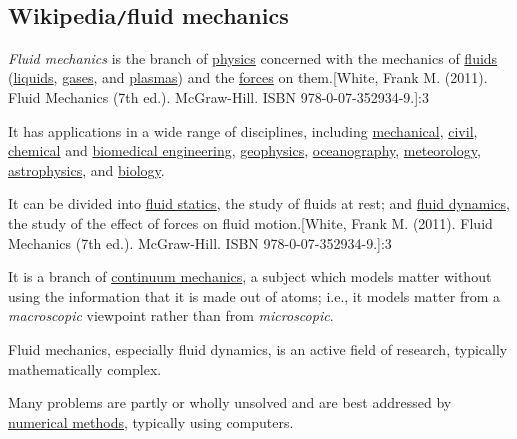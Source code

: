 \documentclass{article}
\begin{document}

\subsection{Wikipedia{\tt/}fluid mechanics}
\textit{Fluid mechanics} is the branch of \href{https://en.wikipedia.org/wiki/Physics}{physics} concerned with the mechanics of \href{https://en.wikipedia.org/wiki/Fluid}{fluids} (\href{https://en.wikipedia.org/wiki/Liquid}{liquids}, \href{https://en.wikipedia.org/wiki/Gas}{gases}, and \href{https://en.wikipedia.org/wiki/Plasma_(physics)}{plasmas}) and the \href{https://en.wikipedia.org/wiki/Force}{forces} on them.[White, Frank M. (2011). Fluid Mechanics (7th ed.). McGraw-Hill. ISBN 978-0-07-352934-9.]:3

It has applications in a wide range of disciplines, including \href{https://en.wikipedia.org/wiki/Mechanical_engineering}{mechanical}, \href{https://en.wikipedia.org/wiki/Civil_engineering}{civil}, \href{https://en.wikipedia.org/wiki/Chemical_engineering}{chemical} and \href{https://en.wikipedia.org/wiki/Biomedical_engineering}{biomedical engineering}, \href{https://en.wikipedia.org/wiki/Geophysics}{geophysics}, \href{https://en.wikipedia.org/wiki/Oceanography}{oceanography}, \href{https://en.wikipedia.org/wiki/Meteorology}{meteorology}, \href{https://en.wikipedia.org/wiki/Astrophysics}{astrophysics}, and \href{https://en.wikipedia.org/wiki/Biology}{biology}.

%
It can be divided into \href{https://en.wikipedia.org/wiki/Fluid_statics}{fluid statics}, the study of fluids at rest; and \href{https://en.wikipedia.org/wiki/Fluid_dynamics}{fluid dynamics}, the study of the effect of forces on fluid motion.[White, Frank M. (2011). Fluid Mechanics (7th ed.). McGraw-Hill. ISBN 978-0-07-352934-9.]:3

It is a branch of \href{https://en.wikipedia.org/wiki/Continuum_mechanics}{continuum mechanics}, a subject which models matter without using the information that it is made out of atoms; i.e., it models matter from a \textit{macroscopic} viewpoint rather than from \textit{microscopic}.

Fluid mechanics, especially fluid dynamics, is an active field of research, typically mathematically complex.

Many problems are partly or wholly unsolved and are best addressed by \href{https://en.wikipedia.org/wiki/Numerical_methods}{numerical methods}, typically using computers.
\end{document}
